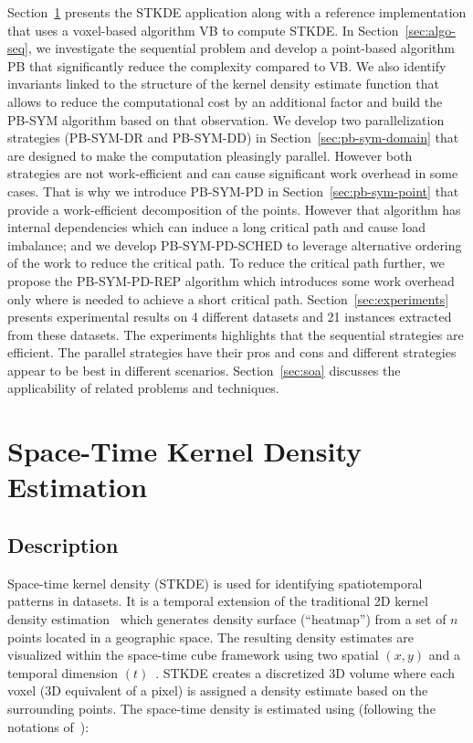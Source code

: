 \documentclass{article}
\begin{document}
Section~\ref{sec:stkde} presents the STKDE application along with a
reference implementation that uses a voxel-based algorithm VB to
compute STKDE. In Section~\ref{sec:algo-seq}, we investigate the
sequential problem and develop a point-based algorithm PB that
significantly reduce the complexity compared to VB. We also identify
invariants linked to the structure of the kernel density estimate
function that allows to reduce the computational cost by an additional
factor and build the PB-SYM algorithm based on that observation. We
develop two parallelization strategies (PB-SYM-DR and PB-SYM-DD) in
Section~\ref{sec:pb-sym-domain} that are designed to make the
computation pleasingly parallel. However both strategies are not work-efficient
and can cause significant work overhead in some cases. That
is why we introduce PB-SYM-PD in Section~\ref{sec:pb-sym-point} that
provide a work-efficient decomposition of the points. However that
algorithm has internal dependencies which can induce a long critical path
and cause load imbalance; and we develop PB-SYM-PD-SCHED to leverage
alternative ordering of the work to reduce the critical path. To
reduce the critical path further, we propose the PB-SYM-PD-REP algorithm which
introduces some work
overhead only where is needed to achieve a short critical path.
Section~\ref{sec:experiments} presents experimental
results on 4 different datasets and 21 instances extracted from
these datasets. The experiments highlights that the sequential
strategies are efficient. The parallel strategies have their pros and
cons and different strategies appear to be best in different
scenarios. Section~\ref{sec:soa} discusses the applicability of related problems and
techniques.

\section{Space-Time Kernel Density Estimation}
\label{sec:stkde}

\subsection{Description}

Space-time kernel density (STKDE) is used for identifying
spatiotemporal patterns in datasets. It is a temporal
extension of the traditional 2D kernel density
estimation~\cite{Silverman86} which generates density surface
(``heatmap'') from a set of $n$ points located in a geographic space. The resulting density
estimates are visualized within the space-time cube framework using two spatial $(x,
y)$ and a temporal dimension $(t)$~\cite{Nakaya10}. STKDE creates a discretized 3D
 volume where each voxel (3D equivalent of a pixel) is assigned a
density estimate based on the surrounding points. The space-time
density is estimated using (following the notations
of~\cite{Hohl16}):
\end{document}
